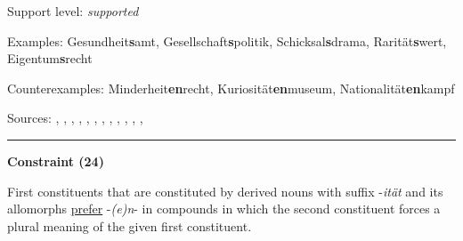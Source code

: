 \vspace{-1.35em}

\noindent
Support level: \textit{supported}

\vspace{0.3em}

\noindent
Examples: Gesundheit\textbf{s}amt, Gesellschaft\textbf{s}politik, Schicksal\textbf{s}drama, Rarität\textbf{s}wert, Eigentum\textbf{s}recht

\noindent
Counterexamples: Minderheit\textbf{en}recht, Kuriosität\textbf{en}museum, Nationalität\textbf{en}kampf

\vspace{0.3em}

\noindent
Sources: \citet[230]{eisenberg_2013}, \citet[572]{fuhrhop_kuerschner_2015}, \citet[61]{koliopoulou_2014}, \citet[3]{krott_etal_2007}, \citet[107, 115]{kuerschner_2005}, \citet[20, 21]{kuerschner_2010}, \citet[10, 20, 23]{nuebling_szczepaniak_2008}, \citet[77]{nuebling_szczepaniak_2013}, \citet[73, 83, 88, 89, 94]{ortner_mueller-bollhagen_1991}, \citet[229]{schaefer_2018}, \citet[8]{schaefer_pankratz_2018}, \citet[19]{schluecker_2023}, \citet[448]{wegener_2003}


\hrule




\vspace{0.4em}

\begin{center}
\textbf{Constraint (24)}
\end{center}

\noindent
First constituents that are constituted by derived nouns with suffix -\textit{ität} and its allomorphs \underline{prefer} -\textit{(e)n}- in compounds in which the second constituent forces a plural meaning of the given first constituent.
\vspace{0.35em}


\vspace{0.3em}

